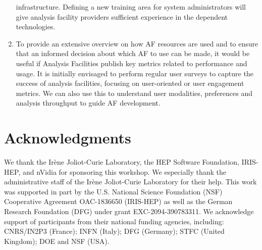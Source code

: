 \documentclass[a4paper,11pt]{article}
\begin{document}
\begin{enumerate}
  infrastructure. Defining a new training area for system administrators
  will give analysis facility providers sufficient experience in the
  dependent technologies.
\item
  To provide an extensive overview on how AF resources are used and to
  ensure that an informed decision about which AF to use can be made, it
  would be useful if Analysis Facilities publish key metrics related to
  performance and usage. It is initially envisaged to perform regular
  user surveys to capture the success of analysis facilities, focusing
  on user-oriented or user engagement metrics. We can also use this to
  understand user modalities, preferences and analysis throughput to
  guide AF development.
\end{enumerate}

\section{Acknowledgments}
We thank the Irène Joliot-Curie Laboratory, the HEP 
Software Foundation, IRIS-HEP, and nVidia for sponsoring
this workshop.
We especially thank the administrative staff of the
Irène Joliot-Curie Laboratory for their help.
This work was supported in part by the U.S. National Science Foundation (NSF) Cooperative Agreement OAC-1836650 (IRIS-HEP) as well as the German Research Foundation (DFG) under grant EXC-2094-390783311.
We acknowledge support of participants from their
national funding agencies, including:
CNRS/IN2P3 (France);
INFN (Italy);
DFG (Germany);
STFC (United Kingdom);
DOE and NSF (USA).

\sloppy
\raggedright
\clearpage
\printbibliography[title={References},heading=bibintoc]
\end{document}
